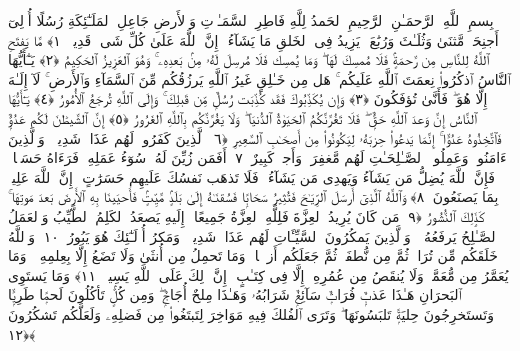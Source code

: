 
  
    
  
    
    

\nopagebreak
  بِسمِ ٱللَّهِ ٱلرَّحمَـٰنِ ٱلرَّحِيمِ
  ٱلحَمدُ لِلَّهِ فَاطِرِ ٱلسَّمَـٰوَٟتِ وَٱلأَرضِ جَاعِلِ ٱلمَلَـٰٓئِكَةِ رُسُلًا أُو۟لِىٓ أَجنِحَةٍۢ مَّثنَىٰ وَثُلَـٰثَ وَرُبَٰعَ ۚ يَزِيدُ فِى ٱلخَلقِ مَا يَشَآءُ ۚ إِنَّ ٱللَّهَ عَلَىٰ كُلِّ شَىءٍۢ قَدِيرٌۭ ﴿١﴾
 مَّا يَفتَحِ ٱللَّهُ لِلنَّاسِ مِن رَّحمَةٍۢ فَلَا مُمسِكَ لَهَا ۖ وَمَا يُمسِك فَلَا مُرسِلَ لَهُۥ مِنۢ بَعدِهِۦ ۚ وَهُوَ ٱلعَزِيزُ ٱلحَكِيمُ ﴿٢﴾
 يَـٰٓأَيُّهَا ٱلنَّاسُ ٱذكُرُوا۟ نِعمَتَ ٱللَّهِ عَلَيكُم ۚ هَل مِن خَـٰلِقٍ غَيرُ ٱللَّهِ يَرزُقُكُم مِّنَ ٱلسَّمَآءِ وَٱلأَرضِ ۚ لَآ إِلَـٰهَ إِلَّا هُوَ ۖ فَأَنَّىٰ تُؤفَكُونَ ﴿٣﴾
 وَإِن يُكَذِّبُوكَ فَقَد كُذِّبَت رُسُلٌۭ مِّن قَبلِكَ ۚ وَإِلَى ٱللَّهِ تُرجَعُ ٱلأُمُورُ ﴿٤﴾
 يَـٰٓأَيُّهَا ٱلنَّاسُ إِنَّ وَعدَ ٱللَّهِ حَقٌّۭ ۖ فَلَا تَغُرَّنَّكُمُ ٱلحَيَوٰةُ ٱلدُّنيَا ۖ وَلَا يَغُرَّنَّكُم بِٱللَّهِ ٱلغَرُورُ ﴿٥﴾
 إِنَّ ٱلشَّيطَٰنَ لَكُم عَدُوٌّۭ فَٱتَّخِذُوهُ عَدُوًّا ۚ إِنَّمَا يَدعُوا۟ حِزبَهُۥ لِيَكُونُوا۟ مِن أَصحَـٰبِ ٱلسَّعِيرِ ﴿٦﴾
 ٱلَّذِينَ كَفَرُوا۟ لَهُم عَذَابٌۭ شَدِيدٌۭ ۖ وَٱلَّذِينَ ءَامَنُوا۟ وَعَمِلُوا۟ ٱلصَّـٰلِحَـٰتِ لَهُم مَّغفِرَةٌۭ وَأَجرٌۭ كَبِيرٌ ﴿٧﴾
 أَفَمَن زُيِّنَ لَهُۥ سُوٓءُ عَمَلِهِۦ فَرَءَاهُ حَسَنًۭا ۖ فَإِنَّ ٱللَّهَ يُضِلُّ مَن يَشَآءُ وَيَهدِى مَن يَشَآءُ ۖ فَلَا تَذهَب نَفسُكَ عَلَيهِم حَسَرَٰتٍ ۚ إِنَّ ٱللَّهَ عَلِيمٌۢ بِمَا يَصنَعُونَ ﴿٨﴾
 وَٱللَّهُ ٱلَّذِىٓ أَرسَلَ ٱلرِّيَـٰحَ فَتُثِيرُ سَحَابًۭا فَسُقنَـٰهُ إِلَىٰ بَلَدٍۢ مَّيِّتٍۢ فَأَحيَينَا بِهِ ٱلأَرضَ بَعدَ مَوتِهَا ۚ كَذَٟلِكَ ٱلنُّشُورُ ﴿٩﴾
 مَن كَانَ يُرِيدُ ٱلعِزَّةَ فَلِلَّهِ ٱلعِزَّةُ جَمِيعًا ۚ إِلَيهِ يَصعَدُ ٱلكَلِمُ ٱلطَّيِّبُ وَٱلعَمَلُ ٱلصَّـٰلِحُ يَرفَعُهُۥ ۚ وَٱلَّذِينَ يَمكُرُونَ ٱلسَّيِّـَٔاتِ لَهُم عَذَابٌۭ شَدِيدٌۭ ۖ وَمَكرُ أُو۟لَـٰٓئِكَ هُوَ يَبُورُ ﴿١٠﴾
 وَٱللَّهُ خَلَقَكُم مِّن تُرَابٍۢ ثُمَّ مِن نُّطفَةٍۢ ثُمَّ جَعَلَكُم أَزوَٟجًۭا ۚ وَمَا تَحمِلُ مِن أُنثَىٰ وَلَا تَضَعُ إِلَّا بِعِلمِهِۦ ۚ وَمَا يُعَمَّرُ مِن مُّعَمَّرٍۢ وَلَا يُنقَصُ مِن عُمُرِهِۦٓ إِلَّا فِى كِتَـٰبٍ ۚ إِنَّ ذَٟلِكَ عَلَى ٱللَّهِ يَسِيرٌۭ ﴿١١﴾
 وَمَا يَستَوِى ٱلبَحرَانِ هَـٰذَا عَذبٌۭ فُرَاتٌۭ سَآئِغٌۭ شَرَابُهُۥ وَهَـٰذَا مِلحٌ أُجَاجٌۭ ۖ وَمِن كُلٍّۢ تَأكُلُونَ لَحمًۭا طَرِيًّۭا وَتَستَخرِجُونَ حِليَةًۭ تَلبَسُونَهَا ۖ وَتَرَى ٱلفُلكَ فِيهِ مَوَاخِرَ لِتَبتَغُوا۟ مِن فَضلِهِۦ وَلَعَلَّكُم تَشكُرُونَ ﴿١٢﴾
